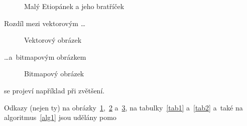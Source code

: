 \documentclass[11pt, a4paper]{article}
\begin{document}
\begin{figure}[h]
    \centering
    \caption{Malý Etiopánek a jeho bratříček}\label{obr1}
\end{figure}

\newpage

Rozdíl mezi vektorovým \dots

\begin{figure}[h]
    \centering
    \caption{Vektorový obrázek}\label{obr2}
\end{figure}

\noindent\dots a~bitmapovým obrázkem

\begin{figure}[h]
    \centering
    \caption{Bitmapový obrázek}\label{obr3}
\end{figure}

\noindent se projeví například při zvětšení.

Odkazy (nejen ty) na obrázky~\ref{obr1},~\ref{obr2} a~\ref{obr3}, na tabulky~\ref{tab1} a~\ref{tab2} a~také na algoritmus~\ref{alg1} jsou udělány pomo
\end{document}
